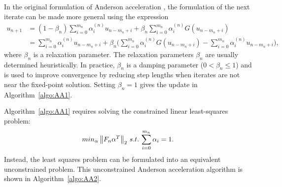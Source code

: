 In the original formulation of Anderson acceleration \cite{anderson1965iterative}, the formulation of the next iterate can be made more general using the expression
\begin{align}
	u_{n+1} &= (1-\beta_{n}) \sum_{i=0}^{m_{n}} \alpha_{i}^{(n)} u_{n-m_{n}+i} + \beta_{n} \sum_{i=0}^{m_{n}} \alpha_{i}^{(n)}G(u_{n-m_{n}+i}) \\
	& = \sum_{i=0}^{m_{n}} \alpha_{i}^{(n)} u_{n-m_{n}+i} + \beta_{n} \bigg (  \sum_{i=0}^{m_{n}} \alpha_{i}^{(n)}G(u_{n-m_{n}+i}) - \sum_{i=0}^{m_{n}} \alpha_{i}^{(n)} u_{n-m_{n}+i} \bigg ),
\end{align}
where $\beta_{n}$ is a relaxation parameter. The relaxation parameters $\beta_{n}$ are usually determined heuristically. In practice, $\beta_{n}$ is a damping parameter ($0 < \beta_{n} \leq 1$) and is used to improve convergence by reducing step lengths when iterates are not near the fixed-point solution. Setting $\beta_{n} = 1$ gives the update in Algorithm~\ref{algo:AA1}.

Algorithm~\ref{algo:AA1} requires solving the constrained linear least-squares problem:
\begin{equation}
	min_{\alpha} \left\lVert F_{n} \alpha^{T}\right\rVert_{2} \, s.t.\, \sum_{i=0}^{m_{n}} \alpha_{i} = 1.
\end{equation}
Instead, the least squares problem can be formulated \cite{anderson1965iterative} into an equivalent unconstrained problem. This unconstrained Anderson acceleration algorithm is shown in Algorithm~\ref{algo:AA2}.


